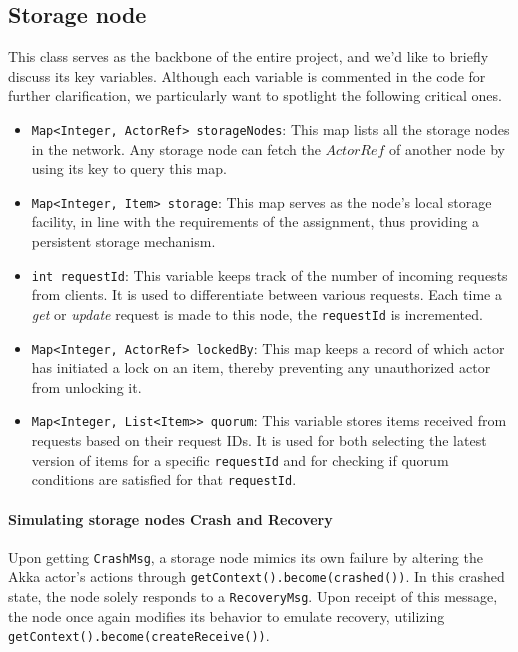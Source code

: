 \documentclass[a4paper, 11pt]{article}
\begin{document}
\subsection{Storage node}\label{storage_node}

This class serves as the backbone of the entire project, and we'd like to briefly discuss its key variables. Although each variable is commented in the code for further clarification, we particularly want to spotlight the following critical ones.

\begin{itemize}
    \item \verb|Map<Integer, ActorRef> storageNodes|: This map lists all the storage nodes in the network. Any storage node can fetch the $ActorRef$ of another node by using its key to query this map.
    \item \verb|Map<Integer, Item> storage|: This map serves as the node's local storage facility, in line with the requirements of the assignment, thus providing a persistent storage mechanism.
    \item \verb|int requestId|: This variable keeps track of the number of incoming requests from clients. It is used to differentiate between various requests. Each time a \textit{get} or \textit{update} request is made to this node, the \verb|requestId| is incremented.
    \item \verb|Map<Integer, ActorRef> lockedBy|: This map keeps a record of which actor has initiated a lock on an item, thereby preventing any unauthorized actor from unlocking it.
    \item \verb|Map<Integer, List<Item>> quorum|: This variable stores items received from requests based on their request IDs. It is used for both selecting the latest version of items for a specific \verb|requestId| and for checking if quorum conditions are satisfied for that \verb|requestId|.
\end{itemize}

\paragraph{Simulating storage nodes Crash and Recovery} Upon getting \verb|CrashMsg|, a storage node mimics its own failure by altering the Akka actor's actions through \verb|getContext().become(crashed())|. In this crashed state, the node solely responds to a \verb|RecoveryMsg|. Upon receipt of this message, the node once again modifies its behavior to emulate recovery, utilizing \verb|getContext().become(createReceive())|.
\end{document}
